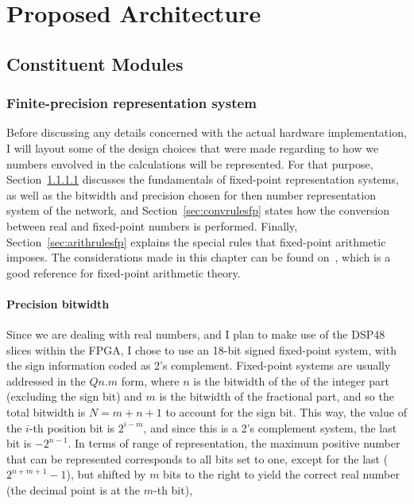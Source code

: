 \chapter{Proposed Architecture}\label{chap:propSol}

\section{Constituent Modules}

\subsection{Finite-precision representation system}
Before discussing any details concerned with the actual hardware implementation, I will layout some of the design choices that were made regarding to how we numbers envolved in the calculations will be represented. For that purpose, Section~\ref{sec:precbit} discusses the fundamentals of fixed-point representation systems, as well as the bitwidth and precision chosen for then number representation system of the network, and Section~\ref{sec:convrulesfp} states how the conversion between real and fixed-point numbers is performed. Finally, Section~\ref{sec:arithrulesfp} explains the special rules that fixed-point arithmetic imposes. The considerations made in this chapter can be found on~\cite{Yates13}, which is a good reference for fixed-point arithmetic theory.

\subsubsection{Precision bitwidth}\label{sec:precbit} 
Since we are dealing with real numbers, and I plan to make use of the DSP48 slices within the FPGA, I chose to use an 18-bit signed fixed-point system, with the sign information coded as 2's complement. Fixed-point systems are usually addressed in the $Qn.m$ form, where $n$ is the bitwidth of the of the integer part (excluding the sign bit) and $m$ is the bitwidth of the fractional part, and so the total bitwidth is $N=m+n+1$ to account for the sign bit. This way, the value of the $i$-th position bit is $2^{i-m}$, and since this is a 2's complement system, the last bit is $-2^{n-1}$. In terms of range of representation, the maximum positive number that can be represented corresponds to all bits set to one, except for the last ($2^{n+m+1}-1$), but shifted by $m$ bits to the right to yield the correct real number (the decimal point is at the $m$-th bit), 


